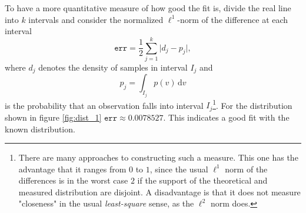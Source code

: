 To have a more quantitative measure of how good the fit is, divide the real line into $k$ intervals and consider the normalized $\ell^1$-norm of the difference at each interval 
\begin{equation}\label{eq:err}
	\texttt{err} = \frac{1}{2} \sum_{j=1}^{k} \rvert d_j - p_j\lvert,
\end{equation}
where $d_j$ denotes the density of samples in interval $I_j$ and 
\[
	p_j = \int_{I_j} p(v) \, \text{d}v
\]
is the probability that an observation falls into interval $I_j$\footnote{There are many approaches to constructing such a measure. This one has the advantage that it ranges from $0$ to $1$, since the usual $\ell^1$ norm of the differences is in the worst case $2$ if the support of the theoretical and measured distribution are disjoint. A disadvantage is that it does not measure "closeness" in the usual \textit{least-square} sense, as the $\ell^2$ norm does.}. For the distribution shown in figure \ref{fig:dist_1} $\texttt{err} \approx  0.0078527$. This indicates a good fit with the known distribution.

%
%
%
%
%
